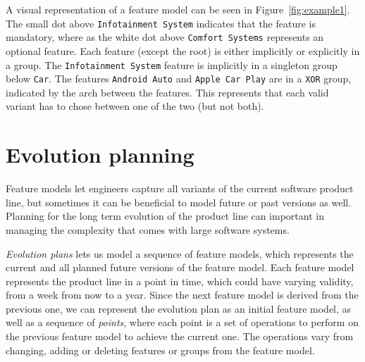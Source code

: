 \documentclass[a4paper,english]{ifimaster}
\begin{document}
A visual representation of a feature model can be seen in Figure~\ref{fig:example1}. The small dot above \texttt{Infotainment System} indicates that the feature is mandatory, where as the white dot above \texttt{Comfort Systems} represents an optional feature. Each feature (except the root) is either implicitly or explicitly in a group. The \texttt{Infotainment System} feature is implicitly in a singleton group below \texttt{Car}. The features \texttt{Android Auto} and \texttt{Apple Car Play} are in a \texttt{XOR} group, indicated by the arch between the features. This represents that each valid variant has to chose between one of the two (but not both).

\section{Evolution planning}%
\label{sec:evolution_planning}

Feature models let engineers capture all variants of the current software product line, but sometimes it can be beneficial to model future or past versions as well. Planning for the long term evolution of the product line can important in managing the complexity that comes with large software systems.

\textit{Evolution plans} lets us model a sequence of feature models, which represents the current and all planned future versions of the feature model. Each feature model represents the product line in a point in time, which could have varying validity, from a week from now to a year. Since the next feature model is derived from the previous one, we can represent the evolution plan as an initial feature model, as well as a sequence of \textit{points}, where each point is a set of operations to perform on the previous feature model to achieve the current one. The operations vary from changing, adding or deleting features or groups from the feature model.
\end{document}
